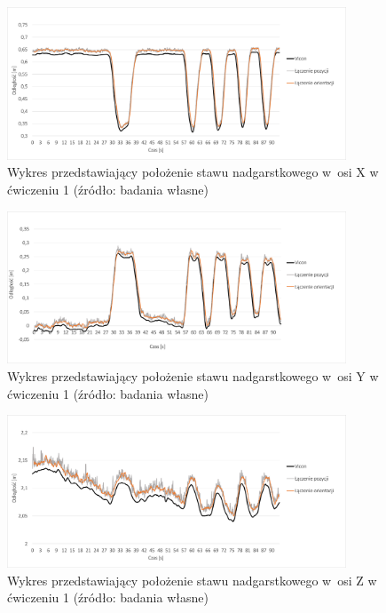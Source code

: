\begin{figure}[!htb]
	\centering
	\includegraphics[width=0.9\textwidth]{images/100/Slide4.png}
	\caption{Wykres przedstawiający położenie stawu nadgarstkowego w~osi X w ćwiczeniu 1 (źródło: badania własne)}
	\label{fig:experiments:first:wristX}
\end{figure}
\begin{figure}[!htb]
	\centering
	\includegraphics[width=0.9\textwidth]{images/100/Slide5.png}
	\caption{Wykres przedstawiający położenie stawu nadgarstkowego w~osi Y w ćwiczeniu 1 (źródło: badania własne)}
	\label{fig:experiments:first:wristY}
\end{figure}
\begin{figure}[!htb]
	\centering
	\includegraphics[width=0.9\textwidth]{images/100/Slide6.png}
	\caption{Wykres przedstawiający położenie stawu nadgarstkowego w~osi Z w ćwiczeniu 1 (źródło: badania własne)}
	\label{fig:experiments:first:wristZ}
\end{figure}
			
